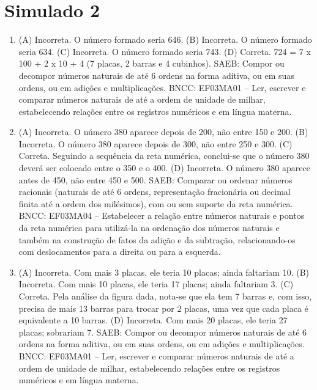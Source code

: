\section*{Simulado 2}

\begin{enumerate}
\item
(A) Incorreta. O número formado seria 646.
(B) Incorreta. O número formado seria 634.
(C) Incorreta. O número formado seria 743.
(D) Correta. 724 = 7 x 100 + 2 x 10 + 4 (7 placas, 2 barras e 4 cubinhos).
SAEB: Compor ou decompor números naturais de até 6 ordens na forma aditiva, ou em suas ordens, ou em adições e multiplicações.
BNCC: EF03MA01 -- Ler, escrever e comparar números naturais de até a ordem de unidade de milhar, estabelecendo relações entre os registros numéricos e em língua materna.

\item
(A) Incorreta. O número 380 aparece depois de 200, não entre 150 e 200.
(B) Incorreta. O número 380 aparece depois de 300, não entre 250 e 300.
(C) Correta. Seguindo a sequência da reta numérica, conclui-se que o número 380 deverá ser colocado entre o 350 e o 400.
(D) Incorreta. O número 380 aparece antes de 450, não entre 450 e 500.
SAEB: Comparar ou ordenar números racionais (naturais de até 6 ordens, representação fracionária ou decimal finita até a ordem dos milésimos), com ou sem suporte da reta numérica.
BNCC: EF03MA04 -- Estabelecer a relação entre números naturais e pontos da reta numérica para
utilizá-la na ordenação dos números naturais e também na construção de fatos da adição e da
subtração, relacionando-os com deslocamentos para a direita ou para a esquerda.

\item
(A) Incorreta. Com mais 3 placas, ele teria 10 placas; ainda faltariam 10.
(B) Incorreta. Com mais 10 placas, ele teria 17 placas; ainda faltariam 3.
(C) Correta. Pela análise da figura dada, nota-se que ela tem 7 barras e, com isso,
precisa de mais 13 barras para trocar por 2 placas, uma vez que cada placa é equivalente a 10 barras.
(D) Incorreta. Com mais 20 placas, ele teria 27 placas; sobrariam 7.
SAEB: Compor ou decompor números naturais de até 6 ordens na forma aditiva, ou em suas ordens, ou em adições e multiplicações.
BNCC: EF03MA01 -- Ler, escrever e comparar números naturais de até a ordem de unidade de milhar, estabelecendo relações entre os registros numéricos e em língua materna.


\end{enumerate}
